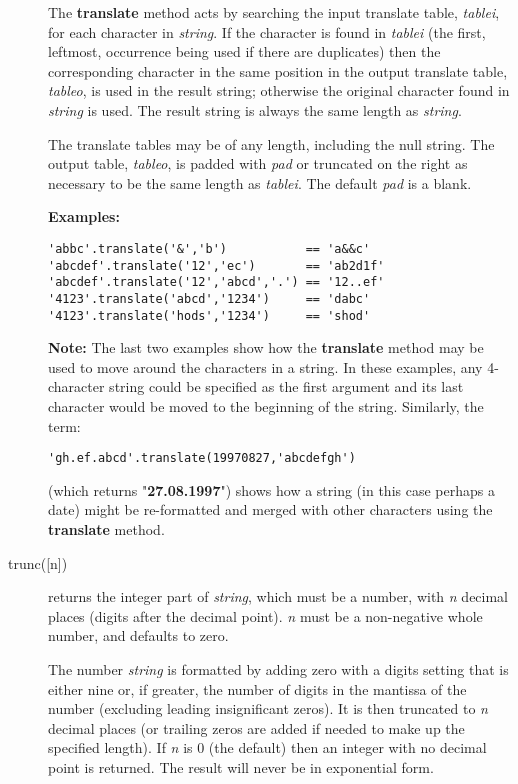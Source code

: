 \begin{description}
The \textbf{translate} method acts by searching the input translate
table, \emph{tablei}, for each character in \emph{string}.
If the character is found in \emph{tablei} (the first, leftmost,
occurrence being used if there are duplicates) then the corresponding
character in the same position in the output translate table,
\emph{tableo}, is used in the result string; otherwise the original
character found in \emph{string} is used.
The result string is always the same length as \emph{string}.
 
The translate tables may be of any length, including the null string.
The output table, \emph{tableo}, is padded with \emph{pad} or
truncated on the right as necessary to be the same length as
\emph{tablei}.
The default \emph{pad} is a blank.
 
\textbf{Examples:}
\begin{lstlisting}
'abbc'.translate('&','b')           == 'a&&c'
'abcdef'.translate('12','ec')       == 'ab2d1f'
'abcdef'.translate('12','abcd','.') == '12..ef'
'4123'.translate('abcd','1234')     == 'dabc'
'4123'.translate('hods','1234')     == 'shod'
\end{lstlisting}
\textbf{Note: }The last two examples show how the \textbf{translate} method
may be used to move around the characters in a string.
In these examples, any 4-character string could be specified as the
first argument and its last character would be moved to the beginning of
the string.
Similarly, the term:
\begin{lstlisting}
'gh.ef.abcd'.translate(19970827,'abcdefgh')
\end{lstlisting}
(which returns "\textbf{27.08.1997}") shows how a string (in
this case perhaps a date) might be re-formatted and merged with other
characters using the \textbf{translate} method.

\item[trunc([n{]})]\label{reftrunc}
returns the integer part of \emph{string}, which must be a
number, with \emph{n} decimal places (digits after the decimal
point).
\emph{n} must be a non-negative whole number, and defaults to zero.
 
The number \emph{string} is formatted by adding zero with a digits
setting that is either nine or, if greater, the number of digits in the
mantissa of the number (excluding leading insignificant zeros).
It is then truncated to \emph{n} decimal places (or trailing zeros
are added if needed to make up the specified length).
If \emph{n} is 0 (the default) then an integer with no decimal
point is returned.
The result will never be in exponential form.
 

\end{description}
